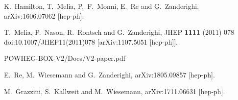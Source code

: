 \documentclass{paper}
\begin{document}
\begin{thebibliography}{1}

  K.~Hamilton, T.~Melia, P.~F.~Monni, E.~Re and G.~Zanderighi,
  arXiv:1606.07062 [hep-ph].

  T.~Melia, P.~Nason, R.~Rontsch and G.~Zanderighi,
  JHEP {\bf 1111} (2011) 078
  doi:10.1007/JHEP11(2011)078
  [arXiv:1107.5051 [hep-ph]].
  
  POWHEG-BOX-V2/Docs/V2-paper.pdf

  E.~Re, M.~Wiesemann and G.~Zanderighi,
  arXiv:1805.09857 [hep-ph].

  M.~Grazzini, S.~Kallweit and M.~Wiesemann,
  arXiv:1711.06631 [hep-ph].

  
\end{thebibliography}
\end{document}
